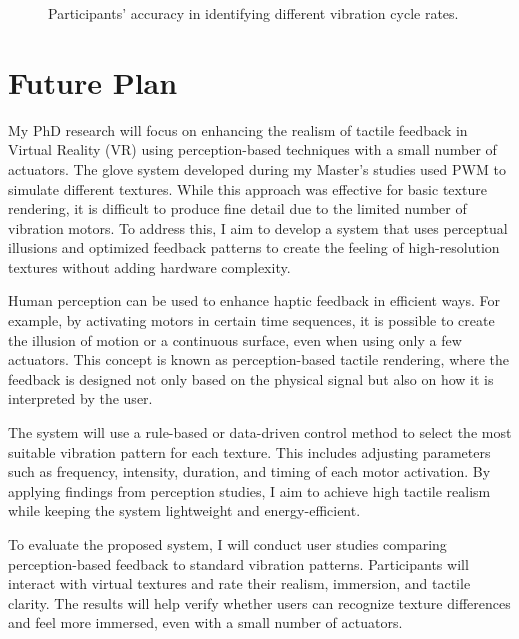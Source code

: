 \documentclass[graybox]{svmult}
\begin{document}
\begin{figure}\centering
	
	\caption{Participants' accuracy in identifying different vibration cycle rates.}\label{fig:questionnaire_results}
\end{figure}



\section{Future Plan}

My PhD research will focus on enhancing the realism of tactile feedback in Virtual Reality (VR) using perception-based techniques with a small number of actuators. The glove system developed during my Master’s studies used PWM to simulate different textures. While this approach was effective for basic texture rendering, it is difficult to produce fine detail due to the limited number of vibration motors. To address this, I aim to develop a system that uses perceptual illusions and optimized feedback patterns to create the feeling of high-resolution textures without adding hardware complexity.

Human perception can be used to enhance haptic feedback in efficient ways. For example, by activating motors in certain time sequences, it is possible to create the illusion of motion or a continuous surface, even when using only a few actuators. This concept is known as perception-based tactile rendering, where the feedback is designed not only based on the physical signal but also on how it is interpreted by the user.

The system will use a rule-based or data-driven control method to select the most suitable vibration pattern for each texture. This includes adjusting parameters such as frequency, intensity, duration, and timing of each motor activation. By applying findings from perception studies, I aim to achieve high tactile realism while keeping the system lightweight and energy-efficient.

To evaluate the proposed system, I will conduct user studies comparing perception-based feedback to standard vibration patterns. Participants will interact with virtual textures and rate their realism, immersion, and tactile clarity. The results will help verify whether users can recognize texture differences and feel more immersed, even with a small number of actuators.
\end{document}
